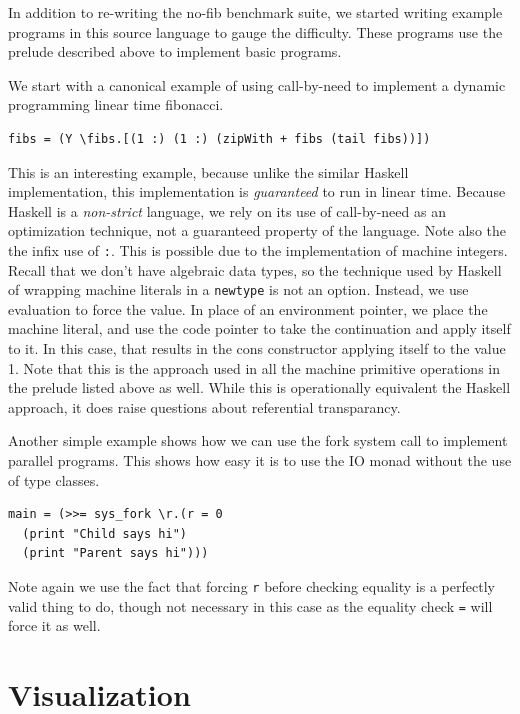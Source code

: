 In addition to re-writing the no-fib benchmark suite, we started writing example
programs in this source language to gauge the difficulty. These programs use the
prelude described above to implement basic programs. 

We start with a canonical example of using call-by-need to implement a
dynamic programming linear time fibonacci. 

\begin{verbatim}
fibs = (Y \fibs.[(1 :) (1 :) (zipWith + fibs (tail fibs))])
\end{verbatim}

This is an interesting example, because unlike the similar Haskell
implementation, this implementation is \emph{guaranteed} to run in linear time.
Because Haskell is a \emph{non-strict} language, we rely on its use of
call-by-need as an optimization technique, not a guaranteed property of the
language. Note also the the infix use of \texttt{:}. This is possible due to the
implementation of machine integers. Recall that we don't have algebraic data
types, so the technique used by Haskell of wrapping machine literals in a
\texttt{newtype} is not an option. Instead, we use evaluation to force the
value. In place of an environment pointer, we place the machine literal, and use
the code pointer to take the continuation and apply itself to it. In this case,
that results in the cons constructor applying itself to the value 1. Note that
this is the approach used in all the machine primitive operations in the prelude
listed above as well. While this is operationally equivalent the Haskell
approach, it does raise questions about referential transparancy.    

Another simple example shows how we can use the fork system call to implement
parallel programs. This shows how easy it is to use the IO monad without the use
of type classes. 

\begin{verbatim}
main = (>>= sys_fork \r.(r = 0
  (print "Child says hi")
  (print "Parent says hi")))
\end{verbatim}

Note again we use the fact that forcing \texttt{r} before checking equality is a
perfectly valid thing to do, though not necessary in this case as the equality
check \texttt{=} will force it as well. 

\section{Visualization}

